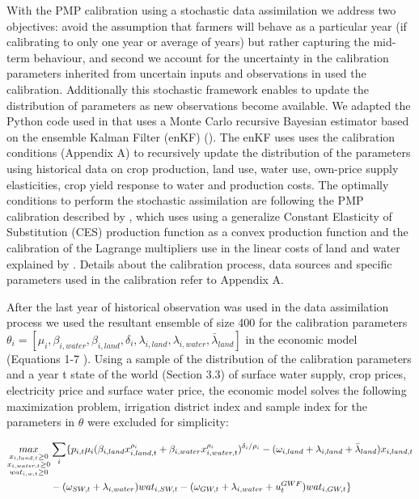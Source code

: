 \documentclass[11pt,a4paper]{article}
\begin{document}
With the PMP calibration using a stochastic data assimilation we address two objectives: avoid the assumption that farmers will behave as a particular year (if calibrating to only one year or average of years) but rather capturing the mid-term behaviour, and second we account for the uncertainty in the calibration parameters inherited from uncertain inputs and observations in used the calibration. Additionally this stochastic framework enables to update the distribution of parameters as new observations become available. We adapted the Python code used in \textcite{maneta_satellite-driven_2020} that uses a Monte Carlo recursive Bayesian estimator based on the ensemble Kalman Filter (enKF) (\cite{evensen_sequential_1994}). The enKF uses uses the calibration conditions (Appendix A) to recursively update the distribution of the parameters using historical data on crop production, land use, water use, own-price supply elasticities, crop yield response to water and production costs. The optimally conditions to perform the stochastic assimilation are following the PMP calibration described by \cite{merel_fully_2011}, which uses using a generalize Constant Elasticity of Substitution (CES) production function as a convex production function and the calibration of the Lagrange multipliers use in the linear costs of land and water explained by \textcite{garnache_calibration_2017}. Details about the calibration process, data sources and specific parameters used in the calibration refer to Appendix A. 

\sloppy After the last year of historical observation was used in the data assimilation process we used the resultant ensemble of size 400 for the calibration parameters $\theta_{i} = [\mu_{i},\beta_{i,water},\beta_{i,land},\delta_{i},\lambda_{i,land},\lambda_{i,water},\bar{\lambda}_{land}]$ in the economic model (Equations 1-7 ). Using a sample of the distribution of the calibration parameters and a year t state of the world (Section 3.3) of surface water supply, crop prices, electricity price and surface water price, the economic model solves the following maximization problem, irrigation district index and sample index for the parameters in $\theta$ were excluded for simplicity:

\begin{alignat}{1}
\underset{{\substack{x_{i,land,t}\geq0\\x_{i,water,t}\geq0\\wat_{i,w,t}\geq0}}}{max}& \sum_{i} \{p_{i,t} \mu_{i}(\beta_{i,land} x^{\rho_i}_{i,land,t}+\beta_{i,water} x^{\rho_i}_{i,water,t})^{\delta_{i}/\rho_i} - (\omega_{i,land} + \lambda_{i,land} + \bar{\lambda}_{land}) x_{i,land,t} \notag \\&-(\omega_{SW,t}+ \lambda_{i,water} )wat_{i,SW,t} - (\omega_{GW,t}+ \lambda_{i,water} + u^{GWF}_{t})wat_{i,GW,t}\}
\end{alignat}
\end{document}
